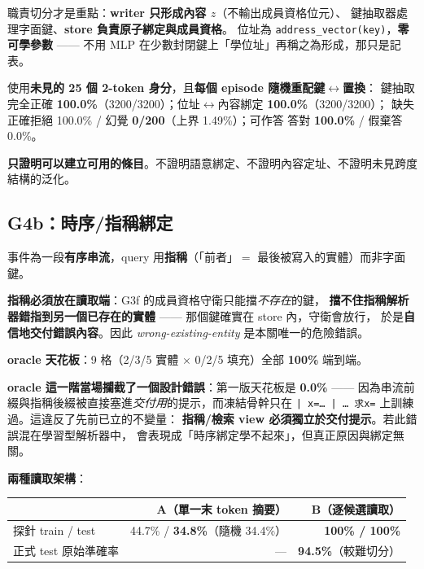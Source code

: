 \documentclass[11pt, a4paper]{article}
\begin{document}
職責切分才是重點：\textbf{writer 只形成內容 $z$}（不輸出成員資格位元）、
鍵抽取器處理字面鍵、\textbf{store 負責原子綁定與成員資格}。
位址為 \verb|address_vector(key)|，\textbf{零可學參數} ——
不用 MLP 在少數封閉鍵上「學位址」再稱之為形成，那只是記表。

使用\textbf{未見的 25 個 2-token 身分}，且\textbf{每個 episode 隨機重配鍵$\leftrightarrow$置換}：
鍵抽取完全正確 \textbf{100.0\%}（3200/3200）；位址$\leftrightarrow$內容綁定 \textbf{100.0\%}（3200/3200）；
缺失 正確拒絕 100.0\% / 幻覺 \textbf{0/200}（上界 1.49\%）；可作答 答對 \textbf{100.0\%} / 假棄答 0.0\%。

\textbf{只證明可以建立可用的條目}。不證明語意綁定、不證明內容定址、不證明未見跨度結構的泛化。

\subsection{G4b：時序/指稱綁定}

事件為一段\textbf{有序串流}，query 用\textbf{指稱}（「前者」$=$ 最後被寫入的實體）而非字面鍵。

\textbf{指稱必須放在讀取端}：G3f 的成員資格守衛只能擋\emph{不存在}的鍵，
\textbf{擋不住指稱解析器錯指到另一個已存在的實體} —— 那個鍵確實在 store 內，守衛會放行，
於是\textbf{自信地交付錯誤內容}。因此 \emph{wrong-existing-entity} 是本關唯一的危險錯誤。

\textbf{oracle 天花板}：9 格（2/3/5 實體 $\times$ 0/2/5 填充）全部 \textbf{100\%} 端到端。

\textbf{oracle 這一階當場攔截了一個設計錯誤}：第一版天花板是 \textbf{0.0\%} ——
因為串流前綴與指稱後綴被直接塞進\emph{交付用}的提示，而凍結骨幹只在
\verb :| x=… | … 求x=: 上訓練過。這違反了先前已立的不變量：
\textbf{指稱/檢索 view 必須獨立於交付提示}。若此錯誤混在學習型解析器中，
會表現成「時序綁定學不起來」，但真正原因與綁定無關。

\textbf{兩種讀取架構}：

\begin{table}[h]
\centering
\small
\begin{tabular}{lrr}
\toprule
& A（單一末 token 摘要）& \textbf{B（逐候選讀取）} \\
\midrule
探針 train / test & 44.7\% / \textbf{34.8\%}（隨機 34.4\%）& \textbf{100\% / 100\%} \\
正式 test 原始準確率 & --- & \textbf{94.5\%}（較難切分）\\
\bottomrule
\end{tabular}
\end{table}
\end{document}
